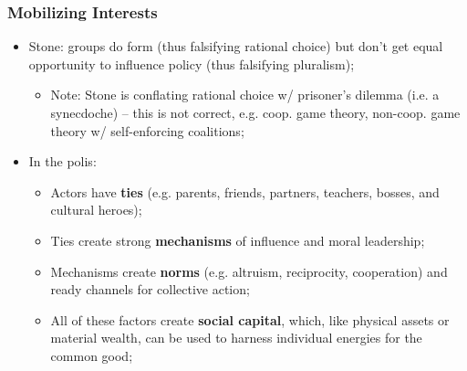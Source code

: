 \documentclass[aspectratio=169]{beamer}
\theoremstyle{principle}
\begin{document}
\begin{frame}
\frametitle{Mobilizing Interests}
\begin{itemize}
\item Stone: groups do form (thus falsifying rational choice) but don't get equal opportunity to influence policy (thus falsifying pluralism);
\begin{itemize}
\item Note: Stone is conflating rational choice w/ prisoner's dilemma (i.e. a synecdoche) -- this is not correct, e.g. coop. game theory, non-coop. game theory w/ self-enforcing coalitions;
\end{itemize}
\bigskip
\bigskip
\item In the polis:
\begin{itemize}
\item Actors have \textbf{ties} (e.g. parents, friends, partners, teachers, bosses, and cultural heroes); 
\item Ties create strong \textbf{mechanisms} of influence and moral leadership;
\item Mechanisms create \textbf{norms} (e.g. altruism, reciprocity, cooperation) and ready channels for collective action;
\item All of these factors create \textbf{social capital}, which, like physical assets or material wealth, can be used to harness individual energies for the common good;
\end{itemize}
\end{itemize}
\end{frame}
\end{document}
